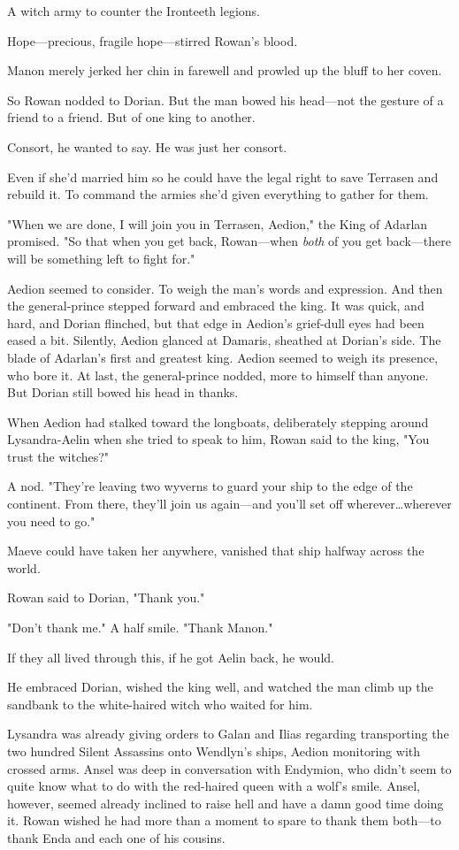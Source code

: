 A witch army to counter the Ironteeth legions.

Hope---precious, fragile hope---stirred Rowan's blood.

Manon merely jerked her chin in farewell and prowled up the bluff to her coven.

So Rowan nodded to Dorian.
But the man bowed his head---not the gesture of a friend to a friend.
But of one king to another.

Consort, he wanted to say.
He was just her consort.

Even if she'd married him so he could have the legal right to save Terrasen and rebuild it.
To command the armies she'd given everything to gather for them.

"When we are done, I will join you in Terrasen, Aedion," the King of Adarlan promised.
"So that when you get back, Rowan---when \emph{both}
of you get back---there will be something left to fight for."

Aedion seemed to consider.
To weigh the man's words and expression.
And then the general-prince stepped forward and embraced the king.
It was quick, and hard, and Dorian flinched, but that edge in Aedion's grief-dull eyes had been eased a bit.
Silently, Aedion glanced at Damaris, sheathed at Dorian's side.
The blade of Adarlan's first and greatest king.
Aedion seemed to weigh its presence, who bore it.
At last, the general-prince nodded, more to himself than anyone.
But Dorian still bowed his head in thanks.

When Aedion had stalked toward the longboats, deliberately stepping around Lysandra-Aelin when she tried to speak to him, Rowan said to the king, "You trust the witches?"

A nod.
"They're leaving two wyverns to guard your ship to the edge of the continent.
From there, they'll join us again---and you'll set off wherever\ldots wherever you need to go."

Maeve could have taken her anywhere, vanished that ship halfway across the world.

Rowan said to Dorian, "Thank you."

"Don't thank me."
A half smile.
"Thank Manon."

If they all lived through this, if he got Aelin back, he would.

He embraced Dorian, wished the king well, and watched the man climb up the sandbank to the white-haired witch who waited for him.

Lysandra was already giving orders to Galan and Ilias regarding transporting the two hundred Silent Assassins onto Wendlyn's ships, Aedion monitoring with crossed arms.
Ansel was deep in conversation with Endymion, who didn't seem to quite know what to do with the red-haired queen with a wolf's smile.
Ansel, however, seemed already inclined to raise hell and have a damn good time doing it.
Rowan wished he had more than a moment to spare to thank them both---to thank Enda and each one of his cousins.

